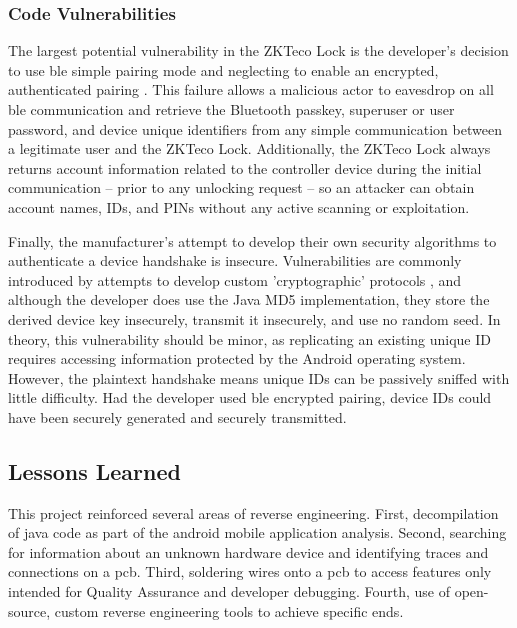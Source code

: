 \documentclass[conference]{IEEEtran}
\begin{document}
\bigskip
\subsubsection{Code Vulnerabilities}

The largest potential vulnerability in the ZKTeco Lock is the developer's decision to use \gls{ble} simple pairing mode and neglecting to enable an encrypted, authenticated pairing \cite{Quinn2019}.  This failure allows a malicious actor to eavesdrop on all \gls{ble} communication and retrieve the Bluetooth passkey, superuser or user password, and device unique identifiers from any simple communication between a legitimate user and the ZKTeco Lock.  Additionally, the ZKTeco Lock always returns account information related to the controller device during the initial communication -- prior to any unlocking request -- so an attacker can obtain account names, IDs, and PINs without any active scanning or exploitation.

\bigskip

Finally, the manufacturer's attempt to develop their own security algorithms to authenticate a device handshake is insecure.  Vulnerabilities are commonly introduced by attempts to develop custom 'cryptographic' protocols \cite{Chatzikonstantinou2016}, and although the developer does use the Java MD5 implementation, they store the derived device key insecurely, transmit it insecurely, and use no random seed.  In theory, this vulnerability should be minor, as replicating an existing unique ID requires accessing information protected by the Android operating system.  However, the plaintext handshake means unique IDs can be passively sniffed with little difficulty.  Had the developer used \gls{ble} encrypted pairing, device IDs could have been securely generated \cite{Chatzikonstantinou2016} and securely transmitted.

\subsection{Lessons Learned}

This project reinforced several areas of reverse engineering. First, decompilation of java code as part of the android mobile application analysis. Second, searching for information about an unknown hardware device and identifying traces and connections on a \gls{pcb}. Third, soldering wires onto a \gls{pcb} to access features only intended for Quality Assurance and developer debugging. Fourth, use of open-source, custom reverse engineering tools to achieve specific ends. 
\end{document}
